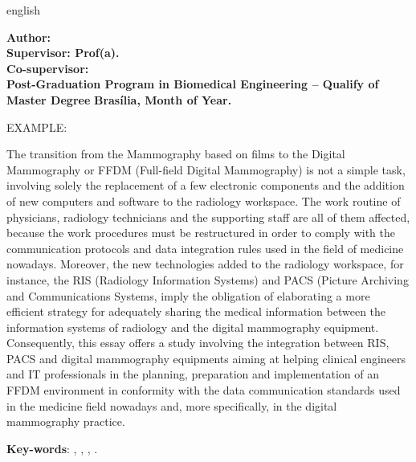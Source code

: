 \begin{resumo}[Abstract]
 \begin{otherlanguage*}{english}

 \begin{center}
\textbf{\imprimirTitle}
\end{center}

\begin{flushleft}
\footnotesize
\textbf{Author: \imprimirautor}\\
\textbf{Supervisor: Prof(a). \imprimirorientador} \\
\textbf{Co-supervisor: \imprimirmembroCoorientador} \\
\textbf{Post-Graduation Program in Biomedical Engineering – Qualify of Master Degree}
\textbf{Brasília, Month of Year.}\newline

EXAMPLE:
\end{flushleft}
 
The transition from the Mammography based on films to the Digital Mammography or
FFDM (Full-field Digital Mammography) is not a simple task, involving solely the
replacement of a few electronic components and the addition of new computers and
software to the radiology workspace. The work routine of physicians, radiology
technicians and the supporting staff are all of them affected, because the work procedures
must be restructured in order to comply with the communication protocols and data
integration rules used in the field of medicine nowadays. Moreover, the new technologies
added to the radiology workspace, for instance, the RIS (Radiology Information Systems)
and PACS (Picture Archiving and Communications Systems, imply the obligation of
elaborating a more efficient strategy for adequately sharing the medical information
between the information systems of radiology and the digital mammography equipment.
Consequently, this essay offers a study involving the integration between RIS, PACS and
digital mammography equipments aiming at helping clinical engineers and IT
professionals in the planning, preparation and implementation of an FFDM environment
in conformity with the data communication standards used in the medicine field nowadays
and, more specifically, in the digital mammography practice.


   \vspace{\onelineskip}
 
   \noindent 
   \textbf{Key-words}: \imprimirpalavrachaveumingles, \imprimirpalavrachavedoisingles, 
			\imprimirpalavrachavetresingles, \imprimirpalavrachavequatroingles.
 \end{otherlanguage*}
\end{resumo}
